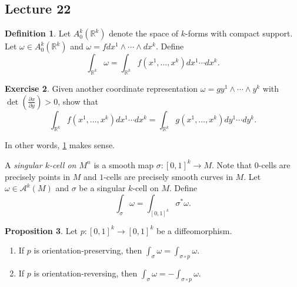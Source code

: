 \documentclass[10pt,letterpaper,cm]{nupset}
\theoremstyle{definition}
\newtheorem{definition}{Definition}[subsection]
\theoremstyle{theorem}
\newtheorem{prop}[definition]{Proposition}
\newtheorem{exercise}[definition]{Exercise}
\theoremstyle{remark}
\newcommand{\R}{\mathbb R}
\newcommand{\1}{\mathbf{1}}
\newcommand{\0}{\vec 0}
\begin{document}
\subsection{Lecture 22}


\begin{definition}\label{forms}
Let $A_0^k\left(\R^k\right)$ denote the space of $k$-forms with compact support. Let $\omega \in A_0^k(\R^k)$ and  $\omega = fdx^1\wedge \cdots \wedge dx^k$. Define $$ \int_{\R^k}\omega = \int_{\R^k} f(x^1, \ldots, x^k)dx^1\cdots dx^k  .$$
\end{definition}

\begin{exercise}
Given another coordinate representation $\omega = gy^1 \wedge \cdots \wedge y^k$ with $\det\left(\frac{\partial{x}}{\partial{y}}\right) >0$, show that $$\int_{\R^k} f(x^1, \ldots, x^k)dx^1\cdots dx^k  = \int_{\R^k} g(x^1, \ldots, x^k)dy^1\cdots dy^k.$$
\end{exercise}

In other words, \cref{forms} makes sense.

\medskip


A \textit{singular $k$-cell on $M^n$} is a smooth map $\sigma : \left[0,1\right]^k \to M$.
Note that $0$-cells are precisely points in $M$ and $1$-cells are precisely smooth curves in $M$.
Let $\omega \in \mathcal{A}^k(M)$ and $\sigma$ be a singular $k$-cell on $M$. Define $$ \int_{\sigma} \omega = \int_{\left[0,1\right]^k}\sigma^{\ast}\omega  .$$


\begin{prop}\label{preserve}
Let $p: \left[0,1\right]^k \to \left[0,1\right]^k$ be a diffeomorphism. 
\begin{enumerate}
\item If $p$ is orientation-preserving, then $\int_{\sigma} \omega = \int_{\sigma \circ p} \omega$. 
\item If $p$ is orientation-reversing, then $\int_{\sigma} \omega = {-\int_{\sigma \circ p} \omega}.$
\end{enumerate}
\end{prop}

\pagebreak
\end{document}
